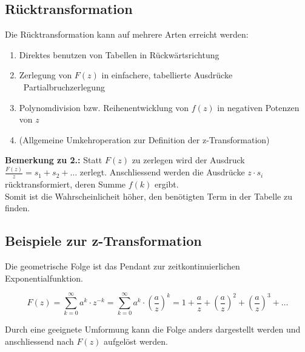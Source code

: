 \subsection{Rücktransformation}
\label{Rücktransformation}

Die Rücktransformation kann auf mehrere Arten erreicht werden:

\smallskip

\begin{enumerate}
    \item Direktes benutzen von Tabellen in Rückwärtsrichtung
    \item Zerlegung von $F(z)$ in einfachere, tabellierte Ausdrücke \textrightarrow\ Partialbruchzerlegung
    \item Polynomdivision bzw. Reihenentwicklung von $f(z)$ in negativen Potenzen von $z$
    \item (Allgemeine Umkehroperation zur Definition der z-Transformation)
\end{enumerate}

\smallskip 

\textbf{Bemerkung zu 2.:} Statt $F(z)$ zu zerlegen wird der Ausdruck $\frac{F(z)}{z} = s_1 + s_2 + \ldots$ zerlegt.
Anschliessend werden die Ausdrücke $z \cdot s_i$ rücktransformiert, deren Summe $f(k)$ ergibt. \\
Somit ist die Wahrscheinlicheit höher, den benötigten Term in der Tabelle zu finden. 



\subsection{Beispiele zur z-Transformation}


Die geometrische Folge ist das Pendant zur zeitkontinuierlichen Exponentialfunktion.

\vspace{-0.2cm}

\[
    F(z)    = \sum\limits_{k=0}^{\infty} a^k \cdot z^{-k} = \sum\limits_{k=0}^{\infty} a^k \cdot \left( \frac{a}{z} \right)^k
            = 1 + \frac{a}{z} + \left( \frac{a}{z} \right)^2 + \left( \frac{a}{z} \right)^3 + \ldots 
\]

Durch eine geeignete Umformung kann die Folge anders dargestellt werden und anschliessend nach $F(z)$ aufgelöst werden.

\vspace{-0.2cm}


